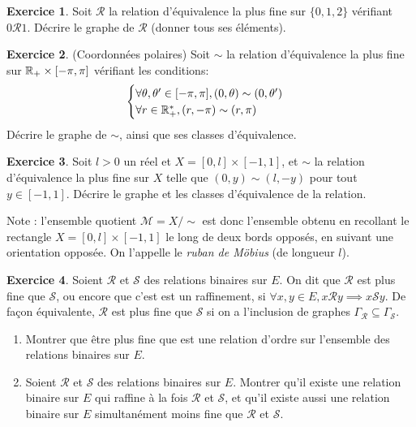 \documentclass[11pt,a4paper]{article}
\theoremstyle{definition}
\newtheorem{exo}{Exercice}
\newcommand{\exercice}[1]{} \newcommand{\finexercice}{}
\newcommand{\enonce}{\begin{exo}} \newcommand{\finenonce}{\end{exo}}
\newcommand{\noindication}{\stepcounter{ind}}
\newcommand{\nocorrection}{\stepcounter{cor}}
\begin{document}
\finindication

\nocorrection

\finexercice
\exercice{7193, megy, 2019/07/23}

\enonce

Soit $\mathcal R$ la relation d'équivalence la plus fine sur $\{0,1,2\}$ vérifiant $0\mathcal R 1$. Décrire le graphe de $\mathcal R$ (donner tous ses éléments).

\finenonce

\noindication

\nocorrection

\finexercice
\exercice{7194, megy, 2019/07/23}

\enonce
(Coordonnées polaires) 
Soit $\sim$ la relation d'équivalence la plus fine sur $\mathbb{R}_+\times [-\pi,\pi]$ vérifiant les conditions: 
\[
\begin{cases}
\forall \theta,\theta'\in [-\pi,\pi], (0,\theta)\sim (0,\theta')\\
\forall r\in \mathbb{R}_+^*, (r,-\pi)\sim (r,\pi)
\end{cases}
\]
Décrire le graphe de $\sim$, ainsi que ses classes d'équivalence.

\finenonce

\noindication

\nocorrection

\finexercice
\exercice{7195, megy, 2019/07/23}

\enonce
Soit $l>0$ un réel et $X=[0,l]\times [-1,1]$, et $\sim$ la relation d'équivalence la plus fine sur $X$ telle que $(0,y)\sim(l,-y)$ pour tout $y\in [-1,1]$.  Décrire le graphe et les classes d'équivalence de la relation. 


Note : l'ensemble quotient $\mathcal M = X/\sim$ est donc l'ensemble obtenu en recollant le rectangle $X=[0,l]\times [-1,1]$ le long de deux bords opposés, en suivant une orientation opposée. On l'appelle le \emph{ruban de Möbius} (de longueur $l$).

\finenonce

\noindication

\nocorrection

\finexercice
\exercice{7196, megy, 2019/07/23}

\enonce
Soient $\mathcal R$ et $\mathcal S$ des relations binaires sur $E$. On dit que $\mathcal R$ est plus fine que $\mathcal S$, ou encore que c'est est un raffinement, si $\forall x, y\in E, x\mathcal R y \implies x\mathcal S y$.  De façon équivalente, $\mathcal R$ est plus fine que $\mathcal S$ si on a l'inclusion de graphes $\Gamma_{\mathcal R} \subseteq \Gamma_{\mathcal S}$.
\begin{enumerate}
\item Montrer que \og être plus fine que \fg{} est une relation d'ordre sur l'ensemble des relations binaires sur $E$.
\item Soient $\mathcal R$ et $\mathcal S$ des relations binaires sur $E$. Montrer qu'il existe une relation binaire sur $E$ qui raffine à la fois $\mathcal R$ et $\mathcal S$, et  qu'il existe aussi une relation binaire sur $E$ simultanément moins fine que $\mathcal R$ et $\mathcal S$.
\end{enumerate}
\finenonce
\end{document}
